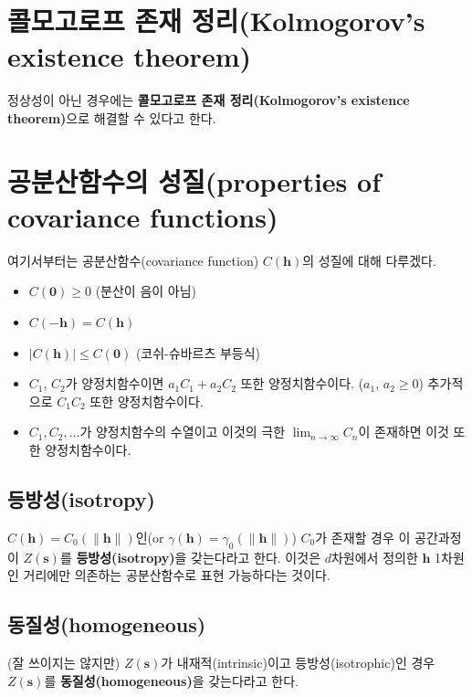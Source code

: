 \documentclass[b5paper,]{scrbook}
\theoremstyle{plain}
\theoremstyle{definition}
\numberwithin{equation}{section}
\begin{document}
\section{콜모고로프 존재 정리(Kolmogorov's existence
theorem)}\label{--kolmogorovs-existence-theorem}

정상성이 아닌 경우에는 \textbf{콜모고로프 존재 정리(Kolmogorov's
existence theorem)}으로 해결할 수 있다고 한다.

\section{공분산함수의 성질(properties of covariance
functions)}\label{-properties-of-covariance-functions}

여기서부터는 공분산함수(covariance function) \(C(\mathbf{h})\)의 성질에
대해 다루겠다.

\begin{itemize}
\item
  \(C(\mathbf{0}) \geq 0\) (분산이 음이 아님)
\item
  \(C(\mathbf{-h})=C(\mathbf{h})\)
\item
  \(|C(\mathbf{h})| \leq C(\mathbf{0})\) (코쉬-슈바르츠 부등식)
\item
  \(C_{1}\), \(C_{2}\)가 양정치함수이면 \(a_{1}C_{1}+a_{2}C_{2}\) 또한
  양정치함수이다. (\(a_{1}\), \(a_{2} \geq 0\)) 추가적으로
  \(C_{1}C_{2}\) 또한 양정치함수이다.
\item
  \(C_{1}, C_{2}, \ldots\)가 양정치함수의 수열이고 이것의 극한
  \(\lim_{n \rightarrow \infty}C_{n}\)이 존재하면 이것 또한
  양정치함수이다.
\end{itemize}

\subsection{등방성(isotropy)}\label{isotropy}

\(C(\mathbf{h})=C_{0}(\|\mathbf{h}\|)\)인(or
\(\gamma(\mathbf{h})=\gamma_{0}(\|\mathbf{h}\|)\)) \(C_{0}\)가 존재할
경우 이 공간과정이 \(Z(\mathbf{s})\)를 \textbf{등방성(isotropy)}을
갖는다라고 한다. 이것은 \(d\)차원에서 정의한 \(\mathbf{h}\) 1차원인
거리에만 의존하는 공분산함수로 표현 가능하다는 것이다.

\subsection{동질성(homogeneous)}\label{homogeneous}

(잘 쓰이지는 않지만) \(Z(\mathbf{s})\)가 내재적(intrinsic)이고
등방성(isotrophic)인 경우 \(Z(\mathbf{s})\)를
\textbf{동질성(homogeneous)}을 갖는다라고 한다.
\end{document}

